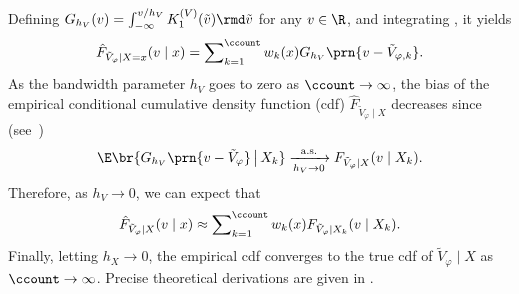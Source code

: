   Defining $G_{h_{V}}(v)= \int_{-\infty}^{v/h_{V}} K_{1}^{(V)}(\tilde{v}) \rmd \tilde{v}$ for any $v\in\R$, and integrating , it yields
  \begin{equation}\label{eq:def:hatF-estimator}
    \hat{F}_{\tilde{V}_{\varphi}\mid X=x}(v \mid x)
    = \sum\nolimits_{k=1}^{\ccount} w_{k}(x) G_{h_{V}}\prn{v - \tilde{V}_{\varphi,k}}.
  \end{equation}
  As the bandwidth parameter $h_{V}$ goes to zero as $\ccount \to \infty$, the bias of the empirical conditional cumulative density function (cdf) $\hat{F}_{\tilde{V}_{\varphi}\mid X}$ decreases since (see~\cite{fan1996estimation})
  \begin{equation*}
    \E\br{G_{h_{V}}\prn{ v - \tilde{V}_{\varphi} } \,\big\vert\, X_k}
    \xrightarrow[h_{V}\to 0]{\text{a.s.}} F_{\tilde{V}_{\varphi}\mid X}(v \mid X_k).
  \end{equation*}
   Therefore, as $h_{V} \to 0$, we can expect that
  \begin{equation*}
    \hat{F}_{\tilde{V}_{\varphi}\mid X}(v \mid x)
    \approx \sum\nolimits_{k=1}^{\ccount} w_{k}(x) F_{\tilde{V}_{\varphi}\mid X_k}(v \mid X_k).
  \end{equation*}
  Finally, letting $h_{X} \to 0$, the empirical cdf converges to the true cdf of \( \tilde{V}_{\varphi} \mid X \) as \( \ccount \to \infty \). Precise theoretical derivations are given in .
  